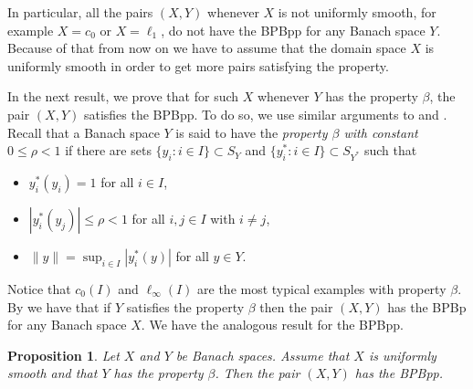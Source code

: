 \documentclass[12pt,a4paper]{amsart}
\newtheorem{proposition}[theorem]{Proposition}
\theoremstyle{definition}
\numberwithin{equation}{section}
\begin{document}
In particular, all the pairs $(X, Y)$ whenever $X$ is not uniformly smooth, for example $X = c_0$ or $X = \ell_1$, do not have the BPBpp for any Banach space $Y$. Because of that from now on we have to assume that the domain space $X$ is uniformly smooth in order to get more pairs satisfying the property. 


In the next result, we prove that for such $X$ whenever $Y$ has the property $\beta$, the pair $(X, Y)$ satisfies the BPBpp. To do so, we use similar arguments to \cite[Theorem 2.2]{AAGM} and \cite[Theorem 4.1]{Martin}. Recall that a Banach space $Y$ is said to  have the {\it property $\beta$ with constant $0 \leq \rho < 1$} if there are sets $\{y_i: i \in I\} \subset S_Y$ and $\{ y_i^*: i \in I \} \subset S_{Y^*}$ such that
\begin{itemize}
\item[(i)] $y_i^*(y_i) = 1$ for all $i \in I$,
\item[(ii)] $|y_i^*(y_j)| \leq \rho < 1$ for all $i, j \in I$ with $i \not= j$,
\item[(iii)] $\|y\| = \sup_{i \in I} |y_i^*(y)|$ for all $y \in Y$.
\end{itemize}
Notice that  $c_0 (I)$ and $\ell_{\infty} (I)$ are the most typical examples with property $\beta$. By \cite[Theorem 2.2]{AAGM} we have that if $Y$ satisfies the property $\beta$ then the pair $(X, Y)$ has the BPBp for any Banach space $X$. We have the analogous result for the BPBpp.

\begin{proposition} Let $X$ and $Y$ be Banach spaces. Assume that $X$ is uniformly smooth and that $Y$ has the property $\beta$. Then the pair $(X, Y)$ has the BPBpp.	
\label{DKL3}
\end{proposition}
\end{document}

